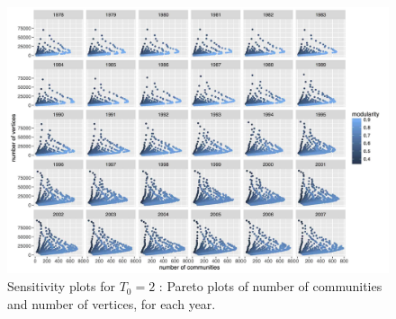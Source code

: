 \documentclass[12pt,twoside,a4paper]{article}
\begin{document}
\begin{figure}
\centering
\includegraphics[width=\textheight,height=\textwidth,angle=90]{vcount_comnum_pareto_window3.jpg}
\caption{Sensitivity plots for $T_0 = 2$ : Pareto plots of number of communities and number of vertices, for each year.}
\label{fig:sensitivity-window3-2}
\end{figure}
\end{document}

